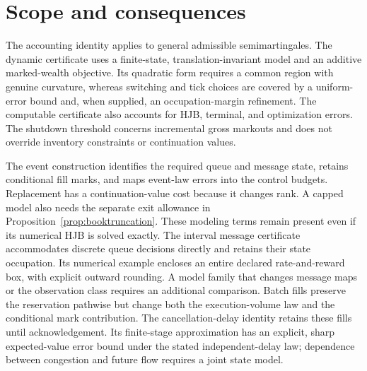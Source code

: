 \documentclass[11pt]{article}
\theoremstyle{plain}
\theoremstyle{definition}
\theoremstyle{remark}
\begin{document}






\section{Scope and consequences}

The accounting identity applies to general admissible semimartingales.
The dynamic certificate uses a finite-state, translation-invariant model
and an additive marked-wealth objective. Its quadratic form requires a
common region with genuine curvature, whereas switching and tick choices
are covered by a uniform-error bound and, when supplied, an
occupation-margin refinement. The computable certificate also accounts
for HJB, terminal, and optimization errors. The shutdown threshold
concerns incremental gross markouts and does not override inventory
constraints or continuation values.

The event construction identifies the required queue and message
state, retains conditional fill marks, and maps event-law errors into
the control budgets. Replacement has a continuation-value cost because
it changes rank. A capped model also needs the separate exit allowance
in Proposition~\ref{prop:booktruncation}. These modeling terms remain
present even if its numerical HJB is solved exactly.
The interval message certificate accommodates discrete queue decisions
directly and retains their state occupation. Its numerical example
encloses an entire declared rate-and-reward box, with explicit
outward rounding. A model family that changes message maps or
the observation class requires an additional comparison.
Batch fills preserve the reservation pathwise but change both the
execution-volume law and the conditional mark contribution.
The cancellation-delay identity retains these fills until
acknowledgement. Its finite-stage approximation has an explicit,
sharp expected-value error bound under the stated independent-delay
law; dependence between congestion and future flow requires a
joint state model.
\end{document}

